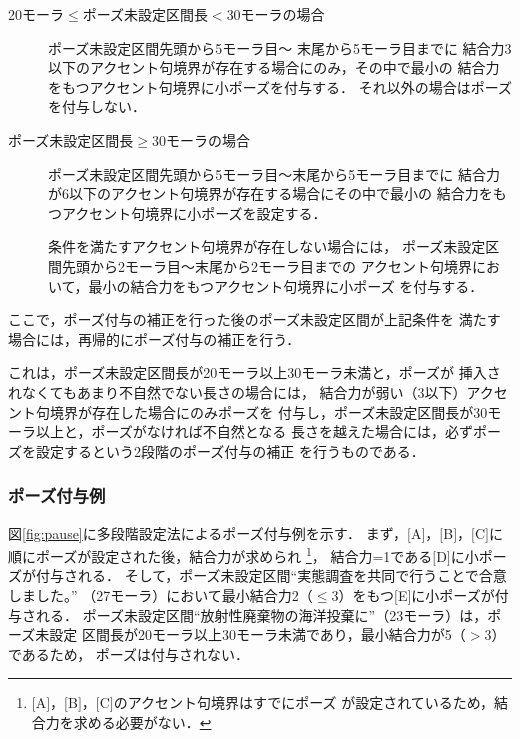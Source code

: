 \begin{description}
\item[20モーラ\hspace{-0.05mm}$\leq$\hspace{-0.05mm}ポーズ未設定区間長\hspace{-0.05mm}$<$\hspace{-0.05mm}30モーラの場合]
\mbox{ポーズ未設定区間先頭から5モーラ目}〜
\mbox{末尾から5モーラ目までに}
\mbox{結合力3以下のアクセント句境界が存在する場合にのみ，そ}の中で最小の
結合力をもつアクセント句境界に小ポーズを付与する．
\mbox{それ以外の場合は}ポーズを付与しない．
\item[ポーズ未設定区間長$\geq$30モーラの場合]
ポーズ未設定区間先頭から5モーラ目〜末尾から5モーラ目までに
結合力が6以下のアクセント句境界が存在する場合にその中で最小の
結合力をもつアクセント句境界に小ポーズを設定する．

条件を満たすアクセント句境界が存在しない場合には，
ポーズ未設定区間先頭から2モーラ目〜末尾から2モーラ目までの
アクセント句境界において，最小の結合力をもつアクセント句境界に小ポーズ
を付与する．
\end{description}

ここで，ポーズ付与の補正を行った後のポーズ未設定区間が上記条件を
満たす場合には，再帰的にポーズ付与の補正を行う．

これは，ポーズ未設定区間長が20モーラ以上30モーラ未満と，ポーズが
挿入されなくてもあまり不自然でない長さの場合には，
結合力が弱い（3以下）アクセント句境界が存在した場合にのみポーズを
付与し，ポーズ未設定区間長が30モーラ以上と，ポーズがなければ不自然となる
長さを越えた場合には，必ずポーズを設定するという2段階のポーズ付与の補正
を行うものである．

\subsubsection{ポーズ付与例}
図\ref{fig:pause}に多段階設定法によるポーズ付与例を示す．
まず，$[$A$]$，$[$B$]$，$[$C$]$に順にポーズが設定された後，結合力が求められ
\footnote{$[$A$]$，$[$B$]$，$[$C$]$のアクセント句境界はすでにポーズ
が設定されているため，結合力を求める必要がない．}，
結合力=1である$[$D$]$に小ポーズが付与される．
そして，ポーズ未設定区間``実態調査を共同で行うことで合意しました。''
（27モーラ）において最小結合力2（$\leq$3）をもつ$[$E$]$に小ポーズが付与される．
ポーズ未設定区間``放射性廃棄物の海洋投棄に''（23モーラ）は，ポーズ未設定
区間長が20モーラ以上30モーラ未満であり，最小結合力が5（$>$3）であるため，
ポーズは付与されない．

